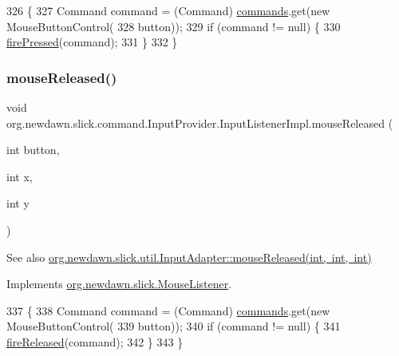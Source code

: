 \begin{DoxyCode}
326                                                            \{
327             Command command = (Command) \mbox{\hyperlink{classorg_1_1newdawn_1_1slick_1_1command_1_1_input_provider_ab2bd0c08506a59bc7457d7a87cf873d2}{commands}}.get(\textcolor{keyword}{new} MouseButtonControl(
328                     button));
329             \textcolor{keywordflow}{if} (command != null) \{
330                 \mbox{\hyperlink{classorg_1_1newdawn_1_1slick_1_1command_1_1_input_provider_a82cd36086b5780ccce446717e8075e96}{firePressed}}(command);
331             \}
332         \}
\end{DoxyCode}
\mbox{\label{classorg_1_1newdawn_1_1slick_1_1command_1_1_input_provider_1_1_input_listener_impl_a4d9fb1e92950944b899dc149357ed93a}} 
\subsubsection{\texorpdfstring{mouse\+Released()}{mouseReleased()}}
{\footnotesize\ttfamily void org.\+newdawn.\+slick.\+command.\+Input\+Provider.\+Input\+Listener\+Impl.\+mouse\+Released (\begin{DoxyParamCaption}\item[{int}]{button,  }\item[{int}]{x,  }\item[{int}]{y }\end{DoxyParamCaption})\hspace{0.3cm}{\ttfamily [inline]}}

\begin{DoxySeeAlso}{See also}
\mbox{\hyperlink{classorg_1_1newdawn_1_1slick_1_1util_1_1_input_adapter_a29e726b1c4d1734882fc38b4c9ecacdb}{org.\+newdawn.\+slick.\+util.\+Input\+Adapter\+::mouse\+Released(int, int, int)}} 
\end{DoxySeeAlso}


Implements \mbox{\hyperlink{interfaceorg_1_1newdawn_1_1slick_1_1_mouse_listener_a8d1606869f610664f9299565067d5571}{org.\+newdawn.\+slick.\+Mouse\+Listener}}.


\begin{DoxyCode}
337                                                             \{
338             Command command = (Command) \mbox{\hyperlink{classorg_1_1newdawn_1_1slick_1_1command_1_1_input_provider_ab2bd0c08506a59bc7457d7a87cf873d2}{commands}}.get(\textcolor{keyword}{new} MouseButtonControl(
339                     button));
340             \textcolor{keywordflow}{if} (command != null) \{
341                 \mbox{\hyperlink{classorg_1_1newdawn_1_1slick_1_1command_1_1_input_provider_afede03e3ab95cb0248635cf64de6874c}{fireReleased}}(command);
342             \}
343         \}
\end{DoxyCode}
